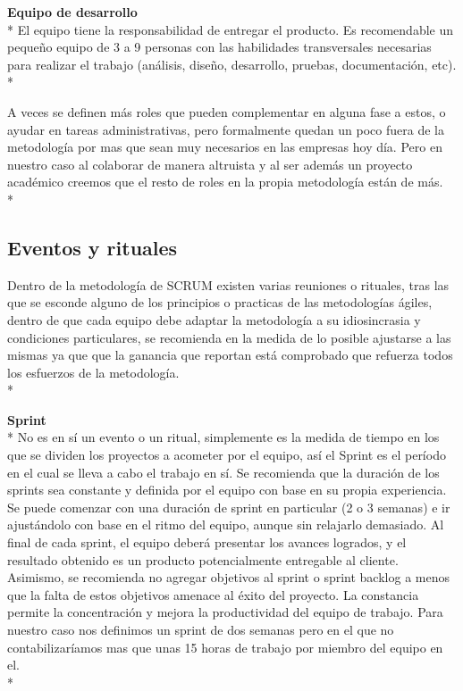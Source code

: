 \documentclass[../pfc.tex]{subfiles}
\begin{document}
	\textbf{Equipo de desarrollo}\\*
	El equipo tiene la responsabilidad de entregar el producto. Es recomendable un pequeño equipo de 3 a 9 personas con las habilidades transversales necesarias para realizar el trabajo (análisis, diseño, desarrollo, pruebas, documentación, etc).\\*
	
	A veces se definen más roles que pueden complementar en alguna fase a estos, o ayudar en tareas administrativas, pero formalmente quedan un poco fuera de la metodología por mas que sean muy necesarios en las empresas hoy día. Pero en nuestro caso al colaborar de manera altruista y al ser además un proyecto académico creemos que el resto de roles  en la propia metodología están de más.\\*
	
	\subsection{Eventos y rituales}
	
	Dentro de la metodología de SCRUM existen varias reuniones o rituales, tras las que se esconde alguno de los principios o practicas de las metodologías ágiles\cite{agile}, dentro de que cada equipo debe adaptar la metodología a su idiosincrasia y condiciones particulares, se recomienda en la medida de lo posible ajustarse a las mismas ya que que la ganancia que reportan está comprobado que refuerza todos los esfuerzos de la metodología.\\* 
		
	\textbf{Sprint}\\* 
	No es en sí un evento o un ritual, simplemente es la medida de tiempo en los que se dividen los proyectos a acometer por el equipo, así el Sprint es el período en el cual se lleva a cabo el trabajo en sí. Se recomienda que la duración de los sprints sea constante y definida por el equipo con base en su propia experiencia. Se puede comenzar con una duración de sprint en particular (2 o 3 semanas) e ir ajustándolo con base en el ritmo del equipo, aunque sin relajarlo demasiado. Al final de cada sprint, el equipo deberá presentar los avances logrados, y el resultado obtenido es un producto potencialmente entregable al cliente. Asimismo, se recomienda no agregar objetivos al sprint o sprint backlog a menos que la falta de estos objetivos amenace al éxito del proyecto. La constancia permite la concentración y mejora la productividad del equipo de trabajo. Para nuestro caso nos definimos un sprint de dos semanas pero en el que no contabilizaríamos mas que unas 15 horas de trabajo por miembro del equipo en el. \\*
	
\end{document}
